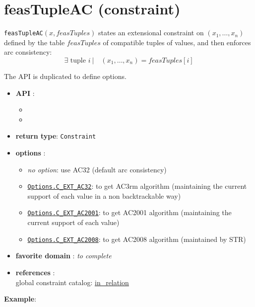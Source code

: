 \label{feastupleac}
\hypertarget{feastupleac}{}

\section{feasTupleAC (constraint)}\label{feastupleac:feastupleacconstraint}\hypertarget{feastupleac:feastupleacconstraint}{}
\begin{notedef}
  \texttt{feasTupleAC}$(x,feasTuples)$ states an extensional constraint on $(x_1,\ldots,x_n)$ defined by the table $feasTuples$ of compatible tuples of values, and then enforces arc consistency:
      $$\exists \text{ tuple } i\ |\quad (x_1,\ldots,x_n)=feasTuples[i]$$
\end{notedef}

The API is duplicated to define options.
\begin{itemize}
	\item \textbf{API} :
	\begin{itemize}
		\item {}
		\item {}
	\end{itemize}
	\item \textbf{return type}: \texttt{Constraint}
	\item \textbf{options} :
	\begin{itemize}
		\item \emph{no option}: use AC32 (default arc consistency)
		\item \hyperlink{cext32:cext32options}{\tt Options.C\_EXT\_AC32}: to get AC3rm algorithm (maintaining the current support of each value in a non backtrackable way)
		\item \hyperlink{cext2001:cext2001options}{\tt Options.C\_EXT\_AC2001}: to get AC2001 algorithm (maintaining the current support of each value)
		\item \hyperlink{cext2008:cext2008options}{\tt Options.C\_EXT\_AC2008}: to get AC2008 algorithm (maintained by STR)
	\end{itemize}
	\item \textbf{favorite domain} : \emph{to complete}
	\item \textbf{references} :\\
      global constraint catalog: \href{http://www.emn.fr/x-info/sdemasse/gccat/Cin_relation.html}{in\_relation}
\end{itemize}

\textbf{Example}:

